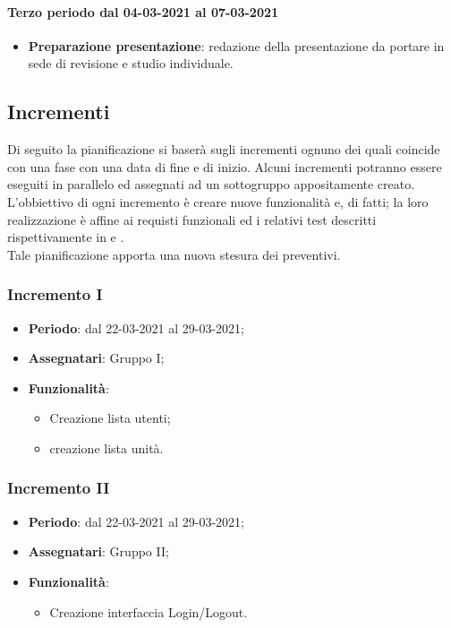 \paragraph{Terzo periodo dal 04-03-2021 al 07-03-2021} 
\begin{itemize} 
	\item \textbf{Preparazione presentazione}: redazione della presentazione da portare in sede di revisione e 
	studio individuale. 
\end{itemize} 

\newpage 
 \newpage
 
 \subsection{Incrementi}
 Di seguito la pianificazione si baserà sugli incrementi ognuno dei quali coincide con una fase con una data di fine e di inizio. Alcuni incrementi potranno essere eseguiti in parallelo ed assegnati ad un sottogruppo appositamente creato. \\
  L'obbiettivo di ogni incremento è creare nuove funzionalità e, di fatti; la loro realizzazione è affine ai requisti funzionali ed i relativi test descritti rispettivamente in  e .\\
 Tale pianificazione apporta una nuova stesura dei preventivi.
 
 \subsubsection{Incremento I} 
  \begin{itemize}
  	\item \textbf{Periodo}: dal 22-03-2021 al 29-03-2021;
  	\item \textbf{Assegnatari}: Gruppo I;
  	\item \textbf{Funzionalità}:
  		\begin{itemize}
  		\item Creazione lista utenti;
  		\item creazione lista unità.
  		
  	\end{itemize}
  	
  \end{itemize}
 
 \subsubsection{Incremento II}
 \begin{itemize}
 	\item \textbf{Periodo}: dal 22-03-2021 al 29-03-2021;
 	\item \textbf{Assegnatari}: Gruppo II;
 	\item \textbf{Funzionalità}:
 	\begin{itemize}
 		\item Creazione interfaccia Login/Logout.		
 	\end{itemize}	
 \end{itemize}

